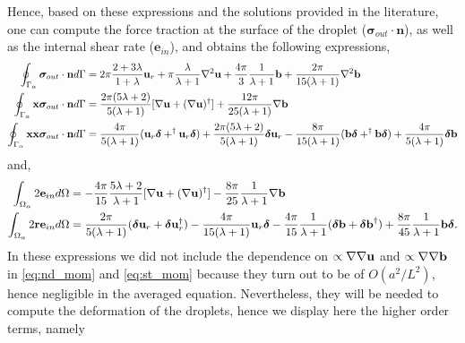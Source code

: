 Hence, based on these expressions and the solutions  provided in the literature, one can compute the force traction at the surface of the droplet ($\bm\sigma_{out}\cdot \textbf{n}$), as well as the internal shear rate ($\textbf{e}_{in}$), and obtains the following expressions, 
\begin{align}
    \intS{\bm\sigma_{out}\cdot \textbf{n}} &
    =
    2\pi\frac{2+3\lambda}{1+\lambda}\textbf{u}_r
    + \pi \frac{\lambda}{\lambda +1} \grad^2 \textbf{u}
    +
    \frac{4\pi}{3}\frac{1}{\lambda +1}\textbf{b}
    + \frac{2\pi}{15(\lambda +1)}\grad^2\textbf{b}
    \\
    \intS{ \textbf{x}\bm\sigma_{out}\cdot \textbf{n}} &
    =
    \frac{2\pi(5\lambda +2)}{5(\lambda +1)}[\grad \textbf{u}+ (\grad \textbf{u})^\dagger]
    + \frac{12\pi}{25(\lambda +1)} \grad \textbf{b} 
    \\
    \intS{\textbf{xx}\bm\sigma_{out}\cdot \textbf{n}} &
    =
    \frac{4\pi}{5(\lambda +1)} (\textbf{u}_r \bm\delta + ^\dagger\textbf{u}_r \bm\delta)
    + \frac{2\pi(5\lambda +2)}{5(\lambda+1)}\bm\delta \textbf{u}_r
    - \frac{8\pi}{15(\lambda +1)} ( \textbf{b}\bm\delta + ^\dagger\textbf{b}\bm\delta )
    + \frac{4\pi}{5(\lambda+1)}\bm\delta \textbf{b}
    \label{eq:nd_mom}
\end{align}
and, 
\begin{align}
    \intO{2\textbf{e}_{in}}
    &=
    -\frac{4\pi}{15}\frac{5\lambda +2}{\lambda+1}
    [\grad \textbf{u}+ (\grad \textbf{u})^\dagger]
    - \frac{8\pi}{25}\frac{1}{\lambda+1}
    \grad\textbf{b}
    \\
    \intO{2\textbf{r}\textbf{e}_{in}}
    &=
    \frac{2\pi}{5(\lambda+1)}
    (\bm\delta \textbf{u}_r +  \bm\delta\textbf{u}_r^\dagger)
    -\frac{4\pi}{15(\lambda+1)}\textbf{u}_r\bm\delta 
    -\frac{4\pi}{15}\frac{1}{\lambda+1}
    (\bm\delta \textbf{b} +  \bm\delta\textbf{b}^\dagger)
    +\frac{8\pi}{45}\frac{1}{\lambda+1}
    \textbf{b}\bm\delta. 
    \label{eq:st_mom}
\end{align}
In these expressions we did not include the dependence on $\propto \mathbf{\nabla}\mathbf{\nabla} \textbf{u}$ and $\propto \mathbf{\nabla}\mathbf{\nabla} \textbf{b}$ in \ref{eq:nd_mom} and \ref{eq:st_mom} because they turn out to be of $O(a^2/L^2)$, hence negligible in the averaged equation. 
Nevertheless, they will be needed to compute the deformation of the droplets, hence we display here the higher order terms, namely 
